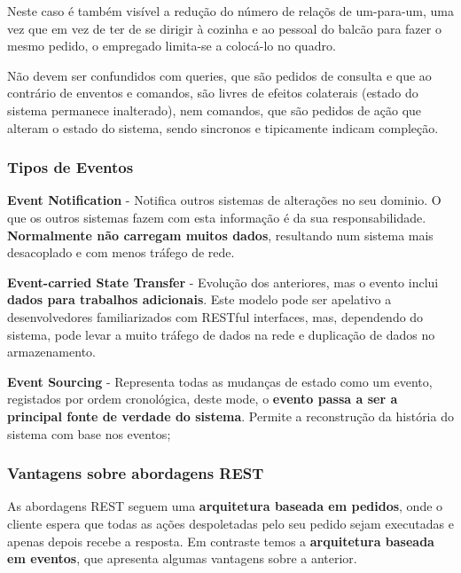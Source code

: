 \documentclass{article}
\begin{document}
Neste caso é também visível a redução do número de relaçõs de um-para-um, uma vez que em vez de ter de se dirigir
à cozinha e ao pessoal do balcão para fazer o mesmo pedido, o empregado limita-se a colocá-lo no quadro.

\vspace{2mm}

Não devem ser confundidos com queries, que são pedidos
de consulta e que ao contrário de enventos e comandos,
são livres de efeitos colaterais (estado do sistema permanece
inalterado), nem comandos, que são pedidos de ação que
alteram o estado do sistema, sendo sincronos e tipicamente
indicam compleção.

\pagebreak

\subsubsection{Tipos de Eventos}

\begin{flushleft}
  \textbf{Event Notification} - Notifica outros sistemas de alterações
  no seu dominio. O que os outros sistemas fazem com esta informação
  é da sua responsabilidade. \textbf{Normalmente não carregam
  muitos dados}, resultando num sistema mais desacoplado e
  com menos tráfego de rede.

  \vspace{1mm}

  \textbf{Event-carried State Transfer} - Evolução dos anteriores,
  mas o evento inclui \textbf{dados para trabalhos adicionais}.
  Este modelo pode ser apelativo a desenvolvedores familiarizados
  com RESTful interfaces, mas, dependendo do sistema, pode
  levar a muito tráfego de dados na rede e duplicação de dados
  no armazenamento.

  \vspace{1mm}

  \textbf{Event Sourcing} - Representa todas as mudanças de estado como um evento, registados por ordem
  cronológica, deste mode, o \textbf{evento passa a ser a principal fonte de
  verdade do sistema}. Permite a reconstrução da história do sistema com base nos eventos;
\end{flushleft}

\subsubsection{Vantagens sobre abordagens REST}

As abordagens REST seguem uma \textbf{arquitetura baseada em pedidos}, onde o cliente espera que
todas as ações despoletadas pelo seu pedido sejam executadas e apenas depois recebe a
resposta. Em contraste temos a \textbf{arquitetura baseada em eventos}, que apresenta algumas
vantagens sobre a anterior.
\end{document}
